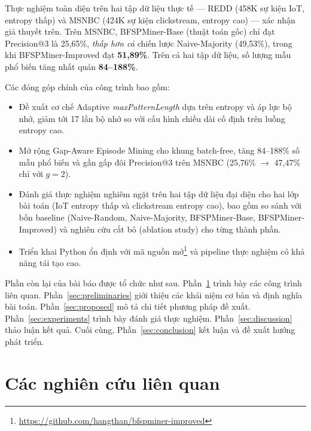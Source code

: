 \documentclass[conference]{IEEEtran}
\begin{document}
Thực nghiệm toàn diện trên hai tập dữ liệu thực tế --- REDD (458K sự kiện IoT, entropy thấp) và MSNBC (424K sự kiện clickstream, entropy cao) --- xác nhận giả thuyết trên. Trên MSNBC, BFSPMiner-Base (thuật toán gốc) chỉ đạt Precision@3 là 25,65\%, \textit{thấp hơn cả} chiến lược Naive-Majority (49,53\%), trong khi BFSPMiner-Improved đạt \textbf{51,89\%}. Trên cả hai tập dữ liệu, số lượng mẫu phổ biến tăng nhất quán \textbf{84--188\%}.

Các đóng góp chính của công trình bao gồm:
\begin{itemize}
    \item[(i)] Đề xuất cơ chế Adaptive \textit{maxPatternLength} dựa trên entropy và áp lực bộ nhớ, giảm tới 17 lần bộ nhớ so với cấu hình chiều dài cố định trên luồng entropy cao.
    \item[(ii)] Mở rộng Gap-Aware Episode Mining cho khung batch-free, tăng 84--188\% số mẫu phổ biến và gần gấp đôi Precision@3 trên MSNBC (25,76\% $\rightarrow$ 47,47\% chỉ với $g = 2$).
    \item[(iii)] Đánh giá thực nghiệm nghiêm ngặt trên hai tập dữ liệu đại diện cho hai lớp bài toán (IoT entropy thấp và clickstream entropy cao), bao gồm so sánh với bốn baseline (Naive-Random, Naive-Majority, BFSPMiner-Base, BFSPMiner-Improved) và nghiên cứu cắt bỏ (ablation study) cho từng thành phần.
    \item[(iv)] Triển khai Python ổn định với mã nguồn mở\footnote{\url{https://github.com/hangthan/bfspminer-improved}} và pipeline thực nghiệm có khả năng tái tạo cao.
\end{itemize}

Phần còn lại của bài báo được tổ chức như sau. Phần~\ref{sec:related} trình bày các công trình liên quan. Phần~\ref{sec:preliminaries} giới thiệu các khái niệm cơ bản và định nghĩa bài toán. Phần~\ref{sec:proposed} mô tả chi tiết phương pháp đề xuất. Phần~\ref{sec:experiments} trình bày đánh giá thực nghiệm. Phần~\ref{sec:discussion} thảo luận kết quả. Cuối cùng, Phần~\ref{sec:conclusion} kết luận và đề xuất hướng phát triển.

\section{Các nghiên cứu liên quan}
\label{sec:related}
\end{document}
